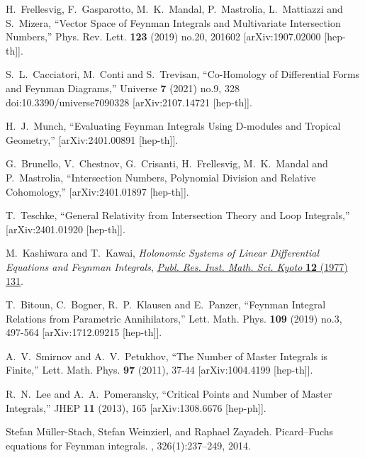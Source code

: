 \documentclass[a4paper,12pt]{article}
\numberwithin{equation}{section}
\numberwithin{figure}{section}
\begin{document}
\begin{thebibliography}{99}
H.~Frellesvig, F.~Gasparotto, M.~K.~Mandal, P.~Mastrolia, L.~Mattiazzi and S.~Mizera,
``Vector Space of Feynman Integrals and Multivariate Intersection Numbers,''
Phys. Rev. Lett. \textbf{123} (2019) no.20, 201602
[arXiv:1907.02000 [hep-th]].
    
S.~L.~Cacciatori, M.~Conti and S.~Trevisan,
``Co-Homology of Differential Forms and Feynman Diagrams,''
Universe \textbf{7} (2021) no.9, 328
doi:10.3390/universe7090328
[arXiv:2107.14721 [hep-th]].

H.~J.~Munch,
``Evaluating Feynman Integrals Using D-modules and Tropical Geometry,''
[arXiv:2401.00891 [hep-th]].
  
G.~Brunello, V.~Chestnov, G.~Crisanti, H.~Frellesvig, M.~K.~Mandal and P.~Mastrolia,
``Intersection Numbers, Polynomial Division and Relative Cohomology,''
[arXiv:2401.01897 [hep-th]].

T.~Teschke,
``General Relativity from Intersection Theory and Loop Integrals,''
[arXiv:2401.01920 [hep-th]].
  


M.~Kashiwara and T.~Kawai, \emph{{Holonomic Systems of Linear Differential
		Equations and Feynman Integrals}},
\href{https://doi.org/10.2977/prims/1195196602}{\emph{Publ. Res. Inst. Math.
		Sci. Kyoto} {\bfseries 12} (1977) 131}.

  
T.~Bitoun, C.~Bogner, R.~P.~Klausen and E.~Panzer,
``Feynman Integral Relations from Parametric Annihilators,''
Lett. Math. Phys. \textbf{109} (2019) no.3, 497-564
[arXiv:1712.09215 [hep-th]].

A.~V.~Smirnov and A.~V.~Petukhov,
``The Number of Master Integrals is Finite,''
Lett. Math. Phys. \textbf{97} (2011), 37-44
[arXiv:1004.4199 [hep-th]].



R.~N.~Lee and A.~A.~Pomeransky,
``Critical Points and Number of Master Integrals,''
JHEP \textbf{11} (2013), 165
[arXiv:1308.6676 [hep-ph]].



Stefan M{\"u}ller-Stach, Stefan Weinzierl, and Raphael Zayadeh.
\newblock Picard--{F}uchs equations for {F}eynman integrals.
,
326(1):237--249, 2014.
\newblock [arXiv:1212.4389]
  

\end{thebibliography}
\end{document}
